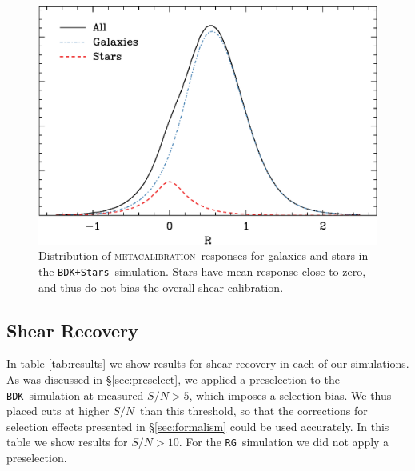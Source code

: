 \documentclass[iop]{emulateapj}
\newcommand{\snr}{$S/N$}
\newcommand{\mcal}{\textsc{metacalibration}}
\newcommand{\bdksim}{\texttt{BDK}}
\newcommand{\bdstar}{\texttt{BDK+Stars}}
\newcommand{\rgsim}{\texttt{RG}}
\begin{document}
\begin{figure}[h]
    \centering
    \includegraphics[width=\columnwidth]{R-bdj03-bdj03stars.eps}

    \caption{Distribution of \mcal\ responses for galaxies and stars in
    the \bdstar\ simulation.  Stars have mean response close to zero,
    and thus do not bias the overall shear calibration.}

\label{fig:Rstars}
\end{figure}



\subsection{Shear Recovery} \label{sec:shear_recover}


In table \ref{tab:results} we show results for shear recovery in each of our
simulations.  As was discussed in \S \ref{sec:preselect}, we applied a
preselection to the \bdksim\ simulation at measured \snr$ > 5$, which imposes
a selection bias.  We thus placed cuts at higher \snr\ than this threshold, so
that the corrections for selection effects presented in \S \ref{sec:formalism}
could be used accurately.  In this table we show results for \snr$ > 10$.  For
the \rgsim\ simulation we did not apply a preselection.
\end{document}
